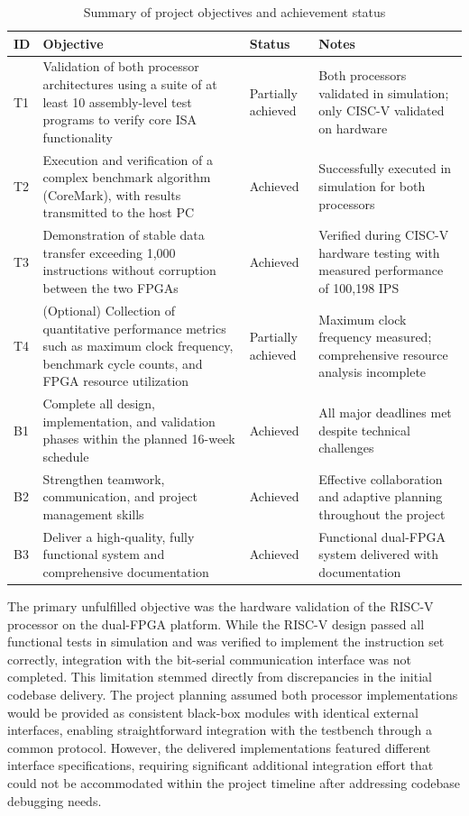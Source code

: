\documentclass[10pt]{article}
\begin{document}
\begin{table}[H]
\centering
\small
\begin{tabular}{p{0.5cm}p{5.5cm}p{2.8cm}p{5.5cm}}
\toprule
\textbf{ID} & \textbf{Objective} & \textbf{Status} & \textbf{Notes} \\
\midrule
T1 & Validation of both processor architectures using a suite of at least 10 assembly-level test programs to verify core ISA functionality & Partially achieved & Both processors validated in simulation; only CISC-V validated on hardware \\
\midrule
T2 & Execution and verification of a complex benchmark algorithm (CoreMark), with results transmitted to the host PC & Achieved & Successfully executed in simulation for both processors \\
\midrule
T3 & Demonstration of stable data transfer exceeding 1,000 instructions without corruption between the two FPGAs & Achieved & Verified during CISC-V hardware testing with measured performance of 100,198 IPS \\
\midrule
T4 & (Optional) Collection of quantitative performance metrics such as maximum clock frequency, benchmark cycle counts, and FPGA resource utilization & Partially achieved & Maximum clock frequency measured; comprehensive resource analysis incomplete \\
\midrule
B1 & Complete all design, implementation, and validation phases within the planned 16-week schedule & Achieved & All major deadlines met despite technical challenges \\
\midrule
B2 & Strengthen teamwork, communication, and project management skills & Achieved & Effective collaboration and adaptive planning throughout the project \\
\midrule
B3 & Deliver a high-quality, fully functional system and comprehensive documentation & Achieved & Functional dual-FPGA system delivered with documentation \\
\bottomrule
\end{tabular}
\caption{Summary of project objectives and achievement status}
\end{table}


The primary unfulfilled objective was the hardware validation of the RISC-V processor on the dual-FPGA platform. While the RISC-V design passed all functional tests in simulation and was verified to implement the instruction set correctly, integration with the bit-serial communication interface was not completed. This limitation stemmed directly from discrepancies in the initial codebase delivery. The project planning assumed both processor implementations would be provided as consistent black-box modules with identical external interfaces, enabling straightforward integration with the testbench through a common protocol. However, the delivered implementations featured different interface specifications, requiring significant additional integration effort that could not be accommodated within the project timeline after addressing codebase debugging needs.
\end{document}
